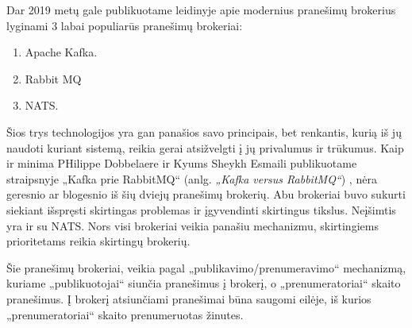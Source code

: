 Dar 2019 metų gale publikuotame leidinyje apie modernius pranešimų brokerius \cite{Misc8} lyginami 3 labai populiarūs 
pranešimų brokeriai:

\begin{enumerate}
  \item Apache Kafka.
  \item Rabbit MQ
  \item NATS.
\end{enumerate}

Šios trys technologijos yra gan panašios savo principais, bet renkantis, kurią iš jų naudoti kuriant sistemą, reikia
gerai atsižvelgti į jų privalumus ir trūkumus. Kaip ir minima PHilippe Dobbelaere ir Kyums Sheykh Esmaili publikuotame straipsnyje „Kafka prie RabbitMQ“
(anlg. \textit{„Kafka versus RabbitMQ“}) \cite{Misc4}, nėra geresnio ar blogesnio iš šių dviejų pranešimų brokerių. Abu brokeriai buvo sukurti siekiant 
išspręsti skirtingas problemas ir įgyvendinti skirtingus tikslus. Neįšimtis yra ir su NATS. Nors visi brokeriai veikia panašiu mechanizmu, skirtingiems prioritetams 
reikia skirtingų brokerių.

Šie pranešimų brokeriai, veikia pagal „publikavimo/prenumeravimo“ mechanizmą, kuriame „publikuotojai“ siunčia pranešimus
į brokerį, o „prenumeratoriai“ skaito pranešimus. Į brokerį atsiunčiami pranešimai būna saugomi eilėje, iš kurios 
„prenumeratoriai“ skaito prenumeruotas žinutes.





